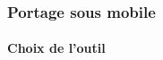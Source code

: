         \begin{frame}
            \frametitle{Portage sous mobile}
            \framesubtitle{Choix de l'outil}
            \begin{columns}
                \begin{column}{.45\linewidth}
                \end{column}
                \begin{column}{.45\linewidth}
                \end{column}
            \end{columns}


\end{frame}
